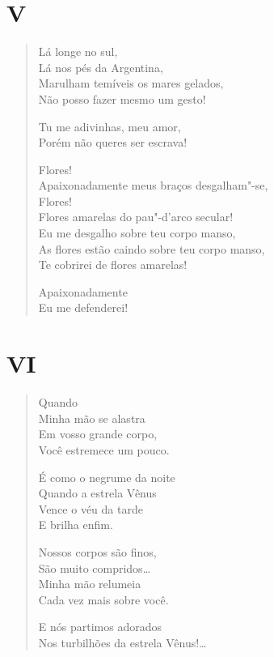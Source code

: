 \pagebreak
\section*{V}

\begin{verse}
Lá longe no sul,\\
Lá nos pés da Argentina,\\
Marulham temíveis os mares gelados,\\
Não posso fazer mesmo um gesto!

Tu me adivinhas, meu amor,\\
Porém não queres ser escrava!

Flores!\\
Apaixonadamente meus braços desgalham"-se,\\
Flores!\\
Flores amarelas do pau"-d'arco secular!\\
Eu me desgalho sobre teu corpo manso,\\
As flores estão caindo sobre teu corpo manso,\\
Te cobrirei de flores amarelas!

Apaixonadamente\\
Eu me defenderei!
\end{verse}

\pagebreak
\section*{VI}

\begin{verse}
Quando\\
Minha mão se alastra\\
Em vosso grande corpo,\\
Você estremece um pouco.

É como o negrume da noite\\
Quando a estrela Vênus\\
Vence o véu da tarde\\
E brilha enfim.

Nossos corpos são finos,\\
São muito compridos\ldots{}\\
Minha mão relumeia\\
Cada vez mais sobre você.

E nós partimos adorados\\
Nos turbilhões da estrela Vênus!\ldots{}
\end{verse}

